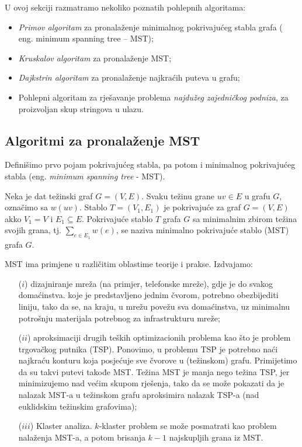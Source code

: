 \documentclass[a4paper, utf8, 11pt, colorlinks]{book}
\theoremstyle{definition}
\begin{document}
U ovoj sekciji razmatramo nekoliko poznatih pohlepnih algoritama:
\begin{itemize}
	\item  \emph{Primov algoritam} za pronalaženje minimalnog pokrivajućeg stabla grafa ( eng. minimum spanning tree -- MST);
	\item  \emph{Kruskalov algoritam} za pronalaženje MST;
	\item  \emph{Dajkstrin algoritam} za pronalaženje najkraćih puteva u grafu;
	\item  Pohlepni algoritam za rješavanje problema \emph{najdužeg zajedničkog podniza}, za proizvoljan skup stringova u ulazu.
\end{itemize}


\subsection{Algoritmi za pronalaženje MST}

Definišimo prvo pojam pokrivajućeg stabla, pa potom i minimalnog pokrivajućeg stabla (eng. \emph{minimum spanning tree} - MST).

Neka je dat težinski graf $G=(V,E)$. Svaku težinu grane $uv \in E $ u grafu $G$, označimo sa $w(uv)$. 
  Stablo $T =(V_1, E_1)$ je pokrivajuće za graf $G=(V,E)$ akko
  $V_1 = V$ i $E_1 \subseteq E$. Pokrivajuće stablo $T$ grafa $G$ sa minimalnim zbirom težina svojih grana, tj. 
  $\sum_{e \in E_1} w(e)$, se naziva minimalno pokrivajuće stablo (MST) grafa $G$. 

MST ima primjene u različitim oblastime teorije i prakse. Izdvajamo:
\begin{enumerate}
 \item[($i$)] dizajniranje mreža (na primjer, telefonske mreže), gdje je do svakog domaćinstva. koje je predstavljeno jednim čvorom, potrebno obezbijediti liniju, tako da se, na kraju, u mrežu povežu sva domaćinstva, uz minimalnu potrošnju materijala potrebnog za infrastrukturu mreže;
 \item[($ii$)] aproksimaciji drugih teških optimizacionih problema kao što je problem trgovačkog putnika (TSP). Ponovimo, u problemu TSP je potrebno naći najkraću konturu koja posjećuje sve čvorove u (težinskom) grafu. Primijetimo da su takvi putevi takođe MST. Težina MST je manja nego težina TSP, jer minimizujemo nad većim skupom rješenja, tako da se može pokazati da je nalazak MST-a u težinskom grafu aproksimira nalazak TSP-a (nad euklidskim težinskim grafovima); 
 \item[($iii$)] Klaster analiza. $k$-klaster problem  se može posmatrati kao problem nalaženja MST-a, a potom brisanja $k-1$ najskupljih grana iz MST. 
 \end{enumerate}
\end{document}

